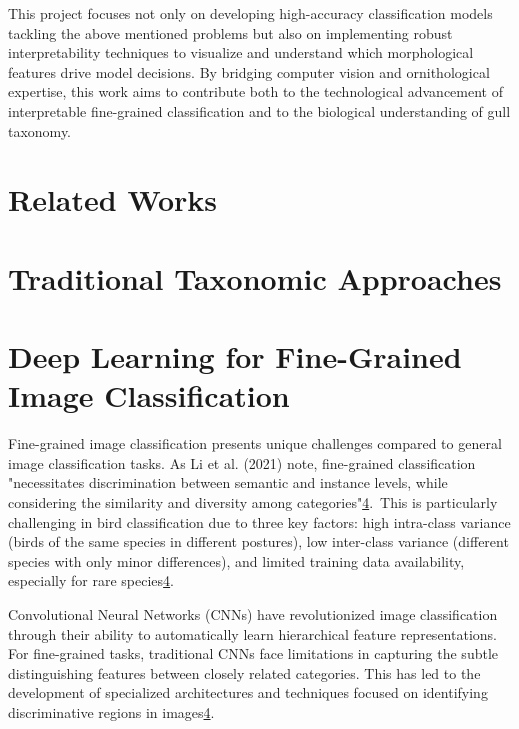 \documentclass[a4paper,12pt]{article}
\begin{document}
This project focuses not only on developing high-accuracy classification models tackling the above mentioned problems but also on implementing robust interpretability techniques to visualize and understand which morphological features drive model decisions. By bridging computer vision and ornithological expertise, this work aims to contribute both to the technological advancement of interpretable fine-grained classification and to the biological understanding of gull taxonomy.

   
\newpage
\section{Related Works}
\section*{Traditional Taxonomic Approaches}

\section*{Deep Learning for Fine-Grained Image Classification}
Fine-grained image classification presents unique challenges compared to general image classification tasks. As Li et al. (2021) note, fine-grained classification "necessitates discrimination between semantic and instance levels, while considering the similarity and diversity among categories"\href{https://www.frontiersin.org/journals/neurorobotics/articles/10.3389/fnbot.2024.1391791/full}{4}. This is particularly challenging in bird classification due to three key factors: high intra-class variance (birds of the same species in different postures), low inter-class variance (different species with only minor differences), and limited training data availability, especially for rare species\href{https://www.frontiersin.org/journals/neurorobotics/articles/10.3389/fnbot.2024.1391791/full}{4}.

Convolutional Neural Networks (CNNs) have revolutionized image classification through their ability to automatically learn hierarchical feature representations. For fine-grained tasks, traditional CNNs face limitations in capturing the subtle distinguishing features between closely related categories. This has led to the development of specialized architectures and techniques focused on identifying discriminative regions in images\href{https://www.frontiersin.org/journals/neurorobotics/articles/10.3389/fnbot.2024.1391791/full}{4}.
\end{document}
